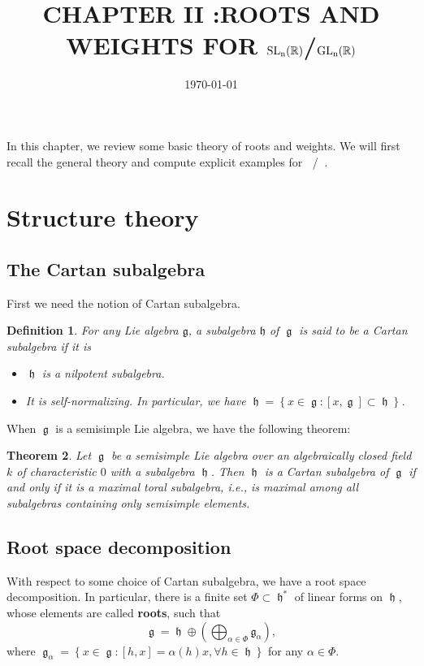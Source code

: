\documentclass[12pt]{article} %
\title{CHAPTER II :ROOTS AND WEIGHTS FOR $\SLn$/$\GLn$} %
\date{\today} %
\newtheorem{definition}{Definition}[section]
\newtheorem{theorem}[definition]{Theorem}
\DeclareMathOperator{\SLn}{\text{SL}_n(\mathbb{R})}
\DeclareMathOperator{\GLn}{\text{GL}_n(\mathbb{R})}
\DeclareMathOperator{\fg}{\mathfrak{g}}
\DeclareMathOperator{\fh}{\mathfrak{h}}
\begin{document}
\maketitle
In this chapter, we review some basic theory of roots and weights. We will first recall the
general theory and compute explicit examples for $\SLn$/$\GLn$.
\section{Structure theory}
\subsection{The Cartan subalgebra}
First we need the notion of Cartan subalgebra.
\begin{definition}
    For any Lie algebra $\mathfrak{g}$, a subalgebra $\mathfrak{h}$ of $\fg$ is said to be a \textit{Cartan subalgebra} if it is
    \begin{itemize}
        \item $\fh$ is a nilpotent subalgebra.
        \item It is self-normalizing. In particular, we have $\fh = \left\lbrace x \in \fg : [x,\fg] \subset \fh\right\rbrace$.
    \end{itemize}
\end{definition}
When $\fg$ is a semisimple Lie algebra, we have the following theorem:
\begin{theorem}
    Let $\fg$ be a semisimple Lie algebra over an algebraically closed field $k$ of characteristic $0$ with a subalgebra $\fh$.
    Then $\fh$ is a Cartan subalgebra of $\fg$ if and only if it is a maximal toral subalgebra, i.e., is maximal among all subalgebras
    containing only semisimple elements.
\end{theorem}
\subsection{Root space decomposition}
With respect to some choice of Cartan subalgebra, we have a root space decomposition. In particular, there is a finite set
$\Phi \subset \fh^{*}$ of linear forms on $\fh$, whose elements are called \textbf{roots}, such that
\[\fg = \fh \oplus \left(\bigoplus_{\alpha \in \Phi} \mathfrak{g}_\alpha\right),\]
where $\fg_\alpha = \left\lbrace x \in \fg: [h,x] = \alpha(h)x, \forall h \in \fh\right\rbrace$ for any $\alpha \in \Phi$.
\end{document}
